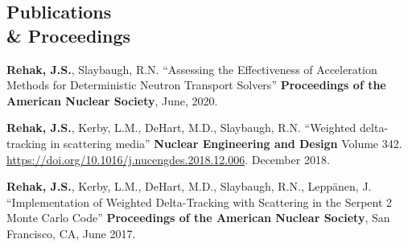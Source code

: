 \documentclass[margin,line]{resume}
\begin{document}
\begin{resume}
    \section{\mysidestyle Publications \\ \& Proceedings}
    \begin{bibsection}
    \item \textbf{Rehak, J.S.}, Slaybaugh, R.N. ``Assessing the Effectiveness of Acceleration Methods for Deterministic Neutron Transport Solvers'' \textbf{Proceedings of the American Nuclear Society}, June, 2020.
      \item \textbf{Rehak, J.S.}, Kerby, L.M., DeHart, M.D., Slaybaugh, R.N.
              ``Weighted delta-tracking in scattering media''
              \textbf{Nuclear Engineering and Design} Volume 342.
              \url{https://doi.org/10.1016/j.nucengdes.2018.12.006}. December 2018.
            \item \textbf{Rehak, J.S.}, Kerby, L.M., DeHart, M.D., Slaybaugh, R.N., Lepp\"{a}nen, J.
              ``Implementation of Weighted Delta-Tracking with Scattering in the Serpent 2 Monte Carlo Code''
              \textbf{Proceedings of the American Nuclear Society}, San Francisco, CA, June 2017.
      \end{bibsection}
                


\end{resume}
\end{document}
